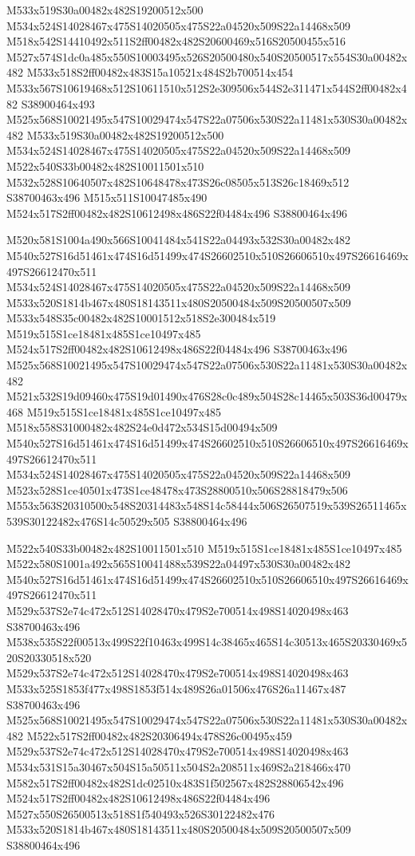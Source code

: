 \documentclass{article}
\begin{document}
\begin{multicols}{2}
M533x519S30a00482x482S19200512x500 M534x524S14028467x475S14020505x475S22a04520x509S22a14468x509 M518x542S14410492x511S2ff00482x482S20600469x516S20500455x516 M527x574S1dc0a485x550S10003495x526S20500480x540S20500517x554S30a00482x482 M533x518S2ff00482x483S15a10521x484S2b700514x454 M533x567S10619468x512S10611510x512S2e309506x544S2e311471x544S2ff00482x482 S38900464x493 M525x568S10021495x547S10029474x547S22a07506x530S22a11481x530S30a00482x482 M533x519S30a00482x482S19200512x500 M534x524S14028467x475S14020505x475S22a04520x509S22a14468x509 M522x540S33b00482x482S10011501x510 M532x528S10640507x482S10648478x473S26c08505x513S26c18469x512 S38700463x496 M515x511S10047485x490 M524x517S2ff00482x482S10612498x486S22f04484x496 S38800464x496

M520x581S1004a490x566S10041484x541S22a04493x532S30a00482x482 M540x527S16d51461x474S16d51499x474S26602510x510S26606510x497S26616469x497S26612470x511 M534x524S14028467x475S14020505x475S22a04520x509S22a14468x509 M533x520S1814b467x480S18143511x480S20500484x509S20500507x509 M533x548S35c00482x482S10001512x518S2e300484x519 M519x515S1ce18481x485S1ce10497x485 M524x517S2ff00482x482S10612498x486S22f04484x496 S38700463x496 M525x568S10021495x547S10029474x547S22a07506x530S22a11481x530S30a00482x482 M521x532S19d09460x475S19d01490x476S28c0c489x504S28c14465x503S36d00479x468 M519x515S1ce18481x485S1ce10497x485 M518x558S31000482x482S24e0d472x534S15d00494x509 M540x527S16d51461x474S16d51499x474S26602510x510S26606510x497S26616469x497S26612470x511 M534x524S14028467x475S14020505x475S22a04520x509S22a14468x509 M523x528S1ce40501x473S1ce48478x473S28800510x506S28818479x506 M553x563S20310500x548S20314483x548S14c58444x506S26507519x539S26511465x539S30122482x476S14c50529x505 S38800464x496

M522x540S33b00482x482S10011501x510 M519x515S1ce18481x485S1ce10497x485 M522x580S1001a492x565S10041488x539S22a04497x530S30a00482x482 M540x527S16d51461x474S16d51499x474S26602510x510S26606510x497S26616469x497S26612470x511 M529x537S2e74c472x512S14028470x479S2e700514x498S14020498x463 S38700463x496 M538x535S22f00513x499S22f10463x499S14c38465x465S14c30513x465S20330469x520S20330518x520 M529x537S2e74c472x512S14028470x479S2e700514x498S14020498x463 M533x525S1853f477x498S1853f514x489S26a01506x476S26a11467x487 S38700463x496 M525x568S10021495x547S10029474x547S22a07506x530S22a11481x530S30a00482x482 M522x517S2ff00482x482S20306494x478S26c00495x459 M529x537S2e74c472x512S14028470x479S2e700514x498S14020498x463 M534x531S15a30467x504S15a50511x504S2a208511x469S2a218466x470 M582x517S2ff00482x482S1dc02510x483S1f502567x482S28806542x496 M524x517S2ff00482x482S10612498x486S22f04484x496 M527x550S26500513x518S1f540493x526S30122482x476 M533x520S1814b467x480S18143511x480S20500484x509S20500507x509 S38800464x496


\end{multicols}
\end{document}
